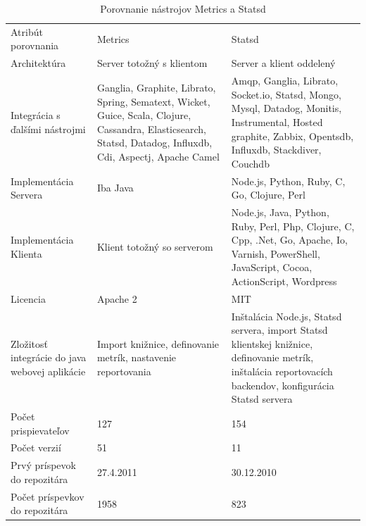 \documentclass[a4paper, upjsfrontpage, disablespecwarning, thesismargins, thesislinespacing]{rnthesis}
\begin{document}
\begin{table}
	\caption{Porovnanie nástrojov Metrics a Statsd}
	\centering
	\begin{tabular}{| p{3.7cm} | p{4.5cm} | p{4.7cm} |}
		\hline\noalign{\smallskip}
		Atribút porovnania & Metrics & Statsd \\
		\noalign{\smallskip}
		\hline
		Architektúra & Server totožný s klientom & Server a klient oddelený \\ \hline

		Integrácia s ďalšími nástrojmi & Ganglia, Graphite, Librato, Spring, Sematext, Wicket, Guice, Scala, Clojure, Cassandra, 	Elasticsearch, Statsd, Datadog, Influxdb, Cdi, Aspectj, Apache Camel & Amqp, Ganglia, Librato, Socket.io, Statsd, Mongo, Mysql, Datadog, Monitis, Instrumental, Hosted graphite, Zabbix, Opentsdb, Influxdb, Stackdiver, Couchdb \\ \hline

		Implementácia Servera & Iba Java & Node.js, Python, Ruby, C, Go, Clojure, 	Perl \\ \hline

		Implementácia Klienta & Klient totožný so serverom & Node.js, Java, Python, Ruby, Perl, Php, Clojure, C, Cpp, .Net, Go, 	Apache, Io, Varnish, PowerShell, JavaScript, Cocoa, ActionScript, Wordpress \\ \hline

		Licencia & Apache 2 & MIT \\ \hline

		Zložitosť integrácie do java webovej aplikácie & Import knižnice, definovanie metrík, nastavenie reportovania & Inštalácia Node.js, Statsd servera, import Statsd klientskej knižnice, definovanie metrík, inštalácia reportovacích backendov, konfigurácia Statsd servera \\ \hline

		Počet prispievateľov & 127 & 154 \\ \hline

		Počet verzií & 51 & 11 \\ \hline

		Prvý príspevok do repozitára & 27.4.2011 & 30.12.2010 \\ \hline
		
		Počet príspevkov do repozitára & 1958 & 823 \\ \hline

	\end{tabular}
\end{table}
\end{document}
